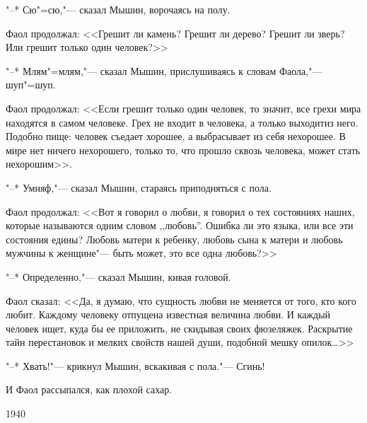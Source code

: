 "--* Сю"=сю,"--- сказал Мышин,  ворочаясь на
полу.

Фаол продолжал: <<Грешит ли камень? Грешит
ли дерево? Грешит ли зверь? Или грешит 
только один человек?>>

"--* Млям"=млям,"--- сказал Мышин, 
прислушиваясь к словам Фаола,"--- шуп"=шуп.

Фаол продолжал: <<Если грешит только один
человек, то значит, все грехи мира находятся
в самом человеке. Грех не входит в человека,
а только выходитиз него. Подобно пище: 
человек съедает  хорошее,  а выбрасывает из
себя нехорошее.  В мире  нет  ничего  нехорошего,
только то, что прошло сквозь человека, может
стать нехорошим>>.

"--* Умняф,"--- сказал Мышин, стараясь 
приподняться с пола.

Фаол продолжал: <<Вот я говорил о  любви,
я говорил  о  тех состояниях наших,  которые
называются одним словом ,,любовь''.  Ошибка ли
это языка, или все эти состояния едины?
Любовь матери к ребенку,  любовь сына к матери
и любовь мужчины к женщине"--- быть может, это
все одна любовь?>>

"--* Определенно,"--- сказал Мышин, кивая головой.

Фаол сказал:  <<Да, я думаю, что сущность
любви не меняется от того,  кто кого  любит.
Каждому человеку отпущена известная величина
любви.  И  каждый  человек ищет,  куда бы ее
приложить, не скидывая своих фюзеляжек. 
Раскрытие тайн перестановок  и  мелких  свойств
нашей души, подобной мешку опилок\dots>>

"--* Хвать!"--- крикнул Мышин,  вскакивая с
пола."--- Сгинь!

И Фаол рассыпался, как плохой сахар.

\hspace{10cm}1940

